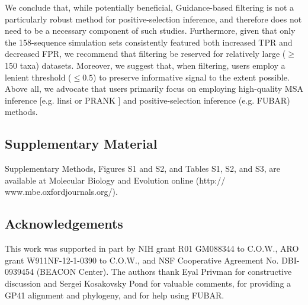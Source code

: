 \documentclass[11pt]{article}
\begin{document}
We conclude that, while potentially beneficial, Guidance-based filtering is not a particularly robust method for positive-selection inference, and therefore does not need to be a necessary component of such studies. Furthermore, given that only the 158-sequence simulation sets consistently featured both increased TPR and decreased FPR, we recommend that filtering be reserved for relatively large ($\geq$ 150 taxa) datasets. Moreover, we suggest that, when filtering, users employ a lenient threshold ($\leq0.5$) to preserve informative signal to the extent possible. Above all, we advocate that users primarily focus on employing high-quality MSA inference [e.g. linsi \citep{Katoh2005} or PRANK \citep{Loytynoja2008}] and positive-selection inference (e.g. FUBAR) methods. 


\subsection*{Supplementary Material}
Supplementary Methods, Figures S1 and S2, and Tables S1, S2, and S3, are available at Molecular Biology and Evolution online (http:// www.mbe.oxfordjournals.org/).


\subsection*{Acknowledgements}
 This work was supported in part by NIH grant R01 GM088344 to C.O.W., ARO grant W911NF-12-1-0390 to  C.O.W.,  and NSF Cooperative Agreement No. DBI-0939454 (BEACON Center). The authors thank Eyal Privman for constructive discussion and Sergei Kosakovsky Pond for valuable comments, for providing a GP41 alignment and phylogeny, and for help using FUBAR.



	

\newpage
\end{document}
